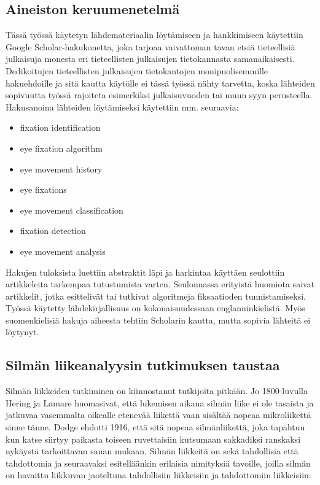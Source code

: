 \subsection{Aineiston keruumenetelmä}
Tässä työssä käytetyn lähdemateriaalin löytämiseen ja hankkimiseen käytettiin Google Scholar-hakukonetta, joka tarjoaa vaivattoman tavan etsiä tieteellisiä julkaisuja monesta eri tieteellisten julkaisujen tietokannasta samanaikaisesti. Dedikoitujen tieteellisten julkaisujen tietokantojen monipuolisemmille hakuehdoille ja sitä kautta käytölle ei tässä työssä nähty tarvetta, koska lähteiden sopivuutta työssä rajoiteta esimerkiksi julkaisuvuoden tai muun syyn perusteella.
Hakusanoina lähteiden löytämiseksi käytettiin mm. seuraavia:

\begin{itemize}
	\item fixation identification
	\item eye fixation algorithm
	\item eye movement history
	\item eye fixations
	\item eye movement classification
	\item fixation detection
	\item eye movement analysis
\end{itemize}

Hakujen tuloksista luettiin abstraktit läpi ja harkintaa käyttäen seulottiin artikkeleita tarkempaa tutustumista varten. Seulonnassa erityistä huomiota saivat artikkelit, jotka esittelivät tai tutkivat algoritmeja fiksaatioden tunnistamiseksi. Työssä käytetty lähdekirjallisuus on kokonaisuudessaan englanninkielistä. Myös suomenkielisiä hakuja aiheesta tehtiin Scholarin kautta, mutta sopivia lähteitä ei löytynyt.


\subsection{Silmän liikeanalyysin tutkimuksen taustaa}

Silmän liikkeiden tutkiminen on kiinnostanut tutkijoita pitkään. Jo 1800-luvulla Hering ja Lamare huomasivat, että lukemisen aikana silmän liike ei ole tasaista ja jatkuvaa vasemmalta oikealle etenevää liikettä vaan sisältää nopeaa mikroliikettä sinne tänne. Dodge ehdotti 1916, että sitä nopeaa silmänliikettä, joka tapahtuu kun katse siirtyy paikasta toiseen ruvettaisiin kutsumaan sakkadiksi ranskaksi nykäystä tarkoittavan sanan mukaan.\citep[s.793]{wade2003dodge} Silmän liikkeitä on sekä tahdollisia että tahdottomia ja seuraavaksi esitelläänkin erilaisia nimityksiä tavoille, joilla silmän on havaittu liikkuvan jaoteltuna tahdollisiin liikkeisiin ja tahdottomiin liikkeisiin:

